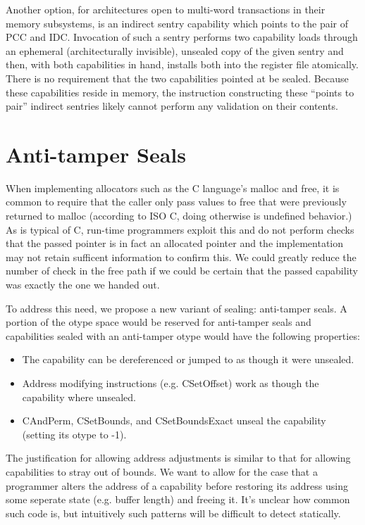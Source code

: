 Another option, for architectures open to multi-word transactions in their
memory subsystems, is an indirect sentry capability which points to the pair of
PCC and IDC.  Invocation of such a sentry performs two capability loads through
an ephemeral (architecturally invisible), unsealed copy of the given sentry and
then, with both capabilities in hand, installs both into the register file
atomically.  There is no requirement that the two capabilities pointed at be
sealed.  Because these capabilities reside in memory, the instruction
constructing these ``points to pair'' indirect sentries likely cannot perform
any validation on their contents.

\section{Anti-tamper Seals}
\label{sec:anti-tamper}

When implementing allocators such as the C language's malloc and free,
it is common to require that the caller only pass values to free that
were previously returned to malloc (according to ISO C, doing otherwise
is undefined behavior.)
As is typical of C, run-time programmers exploit this and do not perform
checks that the passed pointer is in fact an allocated pointer and the
implementation may not retain sufficent information to confirm this.
We could greatly reduce the number of check in the free path if we could
be certain that the passed capability was exactly the one we handed out.

To address this need, we propose a new variant of sealing: anti-tamper seals.
A portion of the otype space would be reserved for anti-tamper seals
and capabilities sealed with an anti-tamper otype would have the following
properties:
\begin{itemize}
  \item The capability can be dereferenced or jumped to as though it were
  unsealed.
%
  \item Address modifying instructions (e.g. CSetOffset) work as though
  the capability where unsealed.
%
  \item CAndPerm, CSetBounds, and CSetBoundsExact unseal the capability
  (setting its otype to -1).
\end{itemize}

The justification for allowing address adjustments is similar to that
for allowing capabilities to stray out of bounds.
We want to allow for the case that a programmer alters the address
of a capability before restoring its address using some seperate state
(e.g. buffer length) and freeing it.
It's unclear how common such code is, but intuitively such patterns
will be difficult to detect statically.

